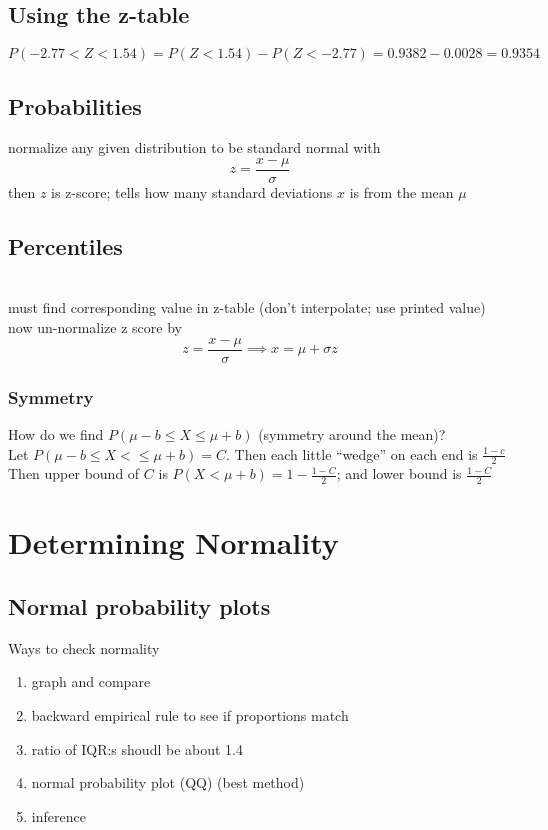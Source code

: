 \subsection{Using the z-table}  %
\begin{equation}
    P(-2.77<Z<1.54)=P(Z<1.54)-P(Z<-2.77)=0.9382 - 0.0028 = 0.9354
\end{equation}

\subsection{Probabilities}  %
normalize any given distribution to be standard normal with
\begin{equation}
    z=\frac{x-\mu}{\sigma}
\end{equation}
then $z$ is z-score; tells how many standard deviations $x$ is from the mean $\mu$
\subsection{Percentiles}  %
 \\
must find corresponding value in z-table (don't interpolate; use printed value) \\
now un-normalize z score by
\begin{equation}
    z=\frac{x-\mu}{\sigma}  \implies x=\mu+\sigma z
\end{equation}

\subsubsection{Symmetry}
How do we find $P(\mu-b\leq X\leq \mu+b)$ (symmetry around the mean)?\\
Let $P(\mu-b\leq X<\leq \mu+b)=C$. Then each little ``wedge'' on each end is \(\frac{1-c}{2}\)\\
Then upper bound of $C$ is \(P(X<\mu+b)=1-\frac{1-C}{2}\); and lower bound is $\frac{1-C}{2}$

\section{Determining Normality}  %


\subsection{Normal probability plots}  %
Ways to check normality
\begin{enumerate}
    \item graph and compare
    \item backward empirical rule to see if proportions match
    \item ratio of IQR:s shoudl be about 1.4
    \item normal probability plot (QQ) (best method)
    \item inference
\end{enumerate}


